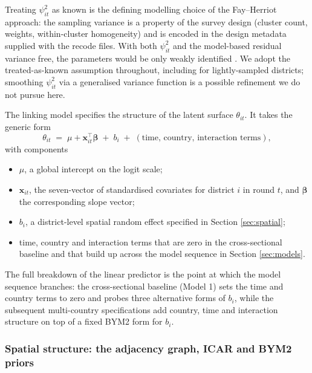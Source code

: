 \documentclass{article}
\begin{document}
Treating \(\psi_{it}^{2}\) as known is the defining modelling choice of
the Fay--Herriot approach: the sampling variance is a property of the
survey design (cluster count, weights, within-cluster homogeneity) and
is encoded in the design metadata supplied with the recode files. With
both \(\psi_{it}^{2}\) and the model-based residual variance free, the
parameters would be only weakly identified \citep{you2002, rao2015}. We
adopt the treated-as-known assumption throughout, including for
lightly-sampled districts; smoothing \(\psi_{it}^{2}\) via a generalised
variance function \citep{rao2015} is a possible refinement we do not
pursue here.

The linking model specifies the structure of the latent surface
\(\theta_{it}\). It takes the generic form \begin{equation}
\theta_{it} \;=\; \mu + \mathbf{x}_{it}^{\top} \bm{\beta} \;+\; b_i \;+\; (\text{time, country, interaction terms}),
\label{eq:fh-link}
\end{equation} with components

\begin{itemize}
\item $\mu$, a global intercept on the logit scale;
\item $\mathbf{x}_{it}$, the seven-vector of standardised covariates for district $i$ in round $t$, and $\bm{\beta}$ the corresponding slope vector;
\item $b_i$, a district-level spatial random effect specified in Section \ref{sec:spatial};
\item time, country and interaction terms that are zero in the cross-sectional baseline and that build up across the model sequence in Section \ref{sec:models}.
\end{itemize}

The full breakdown of the linear predictor is the point at which the
model sequence branches: the cross-sectional baseline (Model 1) sets the
time and country terms to zero and probes three alternative forms of
\(b_i\), while the subsequent multi-country specifications add country,
time and interaction structure on top of a fixed BYM2 form for \(b_i\).

\subsubsection{Spatial structure: the adjacency graph, ICAR and BYM2
priors}\label{spatial-structure-the-adjacency-graph-icar-and-bym2-priors}
\end{document}
